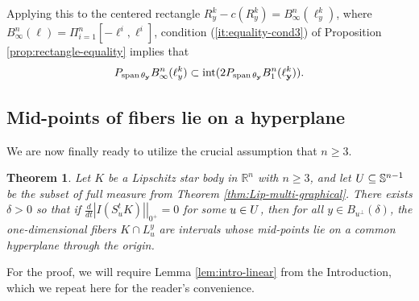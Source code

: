 \documentclass[11pt]{article}
\newtheorem{thm}{Theorem}[section]
\theoremstyle{definition}
\theoremstyle{proof}
\newcommand{\dt}[1]{\left . \frac{d}{dt} #1 \right |_{0^+}}
\DeclareMathOperator{\+}{\mathop{\tilde{+}}}
\DeclareMathOperator{\interior}{\textnormal{int}}
\DeclareMathOperator{\sspan}{\textnormal{span}}
\newcommand{\R}{\mathbb{R}}
\renewcommand{\S}{\mathbb{S}}
\newcommand{\y}{\mathbf{y}}
\newcommand{\h}{\ell}
\numberwithin{equation}{section}
\numberwithin{equation}{section}
\begin{document}
 Applying this to the centered rectangle $R^k_y - c(R^k_y) = B^n_\infty(\h^k_y)$, where $B^n_\infty(\h) = \Pi_{i=1}^n [-\h^i,\h^i]$, condition (\ref{it:equality-cond3}) of Proposition \ref{prop:rectangle-equality} implies that
\[ 
P_{\sspan \theta_\y} B^n_\infty(\h^k_y) \subset \interior (2 P_{\sspan \theta_\y} B^n_1(\h^k_\y)) .
\]
  

\subsection{Mid-points of fibers lie on a hyperplane}

We are now finally ready to utilize the crucial assumption that $n \geq 3$. 

\begin{thm} \label{thm:mid-points}
Let $K$ be a Lipschitz star body in $\R^n$ with $n \geq 3$, and let $\U \subseteq \S^{n-1}$ be the subset of full measure from Theorem \ref{thm:Lip-multi-graphical}.  There exists $\delta > 0$ so that if $\dt{|I(S_u^t K)|} = 0$ for some $u \in U$, then for all $y \in B_{u^{\perp}}(\delta)$, the one-dimensional fibers $K \cap L_u^y$ are intervals whose mid-points lie on a common hyperplane through the origin.
\end{thm}

For the proof, we will require Lemma \ref{lem:intro-linear} from the Introduction, which we repeat here for the reader's convenience.
\end{document}
